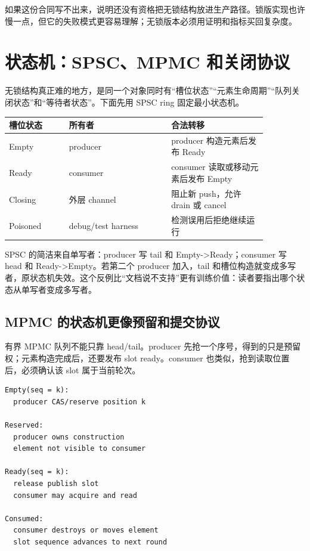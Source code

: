如果这份合同写不出来，说明还没有资格把无锁结构放进生产路径。锁版实现也许慢一点，但它的失败模式更容易理解；无锁版本必须用证明和指标买回复杂度。

\section{状态机：SPSC、MPMC 和关闭协议}

无锁结构真正难的地方，是同一个对象同时有“槽位状态”“元素生命周期”“队列关闭状态”和“等待者状态”。下面先用 SPSC ring 固定最小状态机。

\begin{center}
\begin{tabular}{p{0.20\linewidth}p{0.34\linewidth}p{0.32\linewidth}}
\toprule
槽位状态 & 所有者 & 合法转移 \\
\midrule
Empty & producer & producer 构造元素后发布 Ready \\
Ready & consumer & consumer 读取或移动元素后发布 Empty \\
Closing & 外层 channel & 阻止新 push，允许 drain 或 cancel \\
Poisoned & debug/test harness & 检测误用后拒绝继续运行 \\
\bottomrule
\end{tabular}
\end{center}

SPSC 的简洁来自单写者：producer 写 tail 和 Empty->Ready；consumer 写 head 和 Ready->Empty。若第二个 producer 加入，tail 和槽位构造就变成多写者，原状态机失效。这个反例比“文档说不支持”更有训练价值：读者要指出哪个状态从单写者变成多写者。

\subsection{MPMC 的状态机更像预留和提交协议}

有界 MPMC 队列不能只靠 head/tail。producer 先抢一个序号，得到的只是预留权；元素构造完成后，还要发布 slot ready。consumer 也类似，抢到读取位置后，必须确认该 slot 属于当前轮次。

\begin{lstlisting}[numbers=none,caption={MPMC slot 状态机}]
Empty(seq = k):
  producer CAS/reserve position k

Reserved:
  producer owns construction
  element not visible to consumer

Ready(seq = k):
  release publish slot
  consumer may acquire and read

Consumed:
  consumer destroys or moves element
  slot sequence advances to next round
\end{lstlisting}

